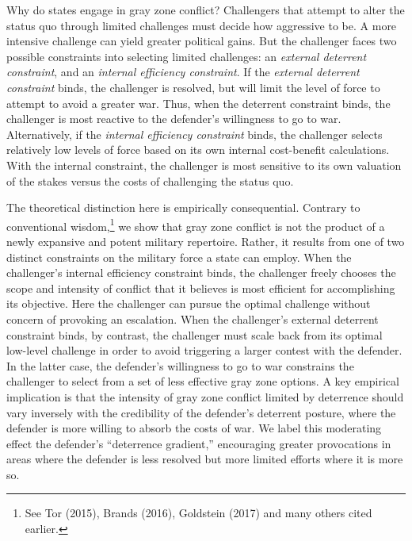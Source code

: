 \documentclass[
]{article}
\begin{document}
Why do states engage in gray zone conflict? Challengers that attempt to alter the status quo through limited challenges must decide how aggressive to be. A more intensive challenge can yield greater political gains. But the challenger faces two possible constraints into selecting limited challenges: an \emph{external deterrent constraint}, and an \emph{internal efficiency constraint}. If the \emph{external deterrent constraint} binds, the challenger is resolved, but will limit the level of force to attempt to avoid a greater war. Thus, when the deterrent constraint binds, the challenger is most reactive to the defender's willingness to go to war. Alternatively, if the \emph{internal efficiency constraint} binds, the challenger selects relatively low levels of force based on its own internal cost-benefit calculations. With the internal constraint, the challenger is most sensitive to its own valuation of the stakes versus the costs of challenging the status quo.

The theoretical distinction here is empirically consequential. Contrary to conventional wisdom,\footnote{See Tor (2015), Brands (2016), Goldstein (2017) and many others cited earlier.} we show that gray zone conflict is not the product of a newly expansive and potent military repertoire. Rather, it results from one of two distinct constraints on the military force a state can employ. When the challenger's internal efficiency constraint binds, the challenger freely chooses the scope and intensity of conflict that it believes is most efficient for accomplishing its objective. Here the challenger can pursue the optimal challenge without concern of provoking an escalation. When the challenger's external deterrent constraint binds, by contrast, the challenger must scale back from its optimal low-level challenge in order to avoid triggering a larger contest with the defender. In the latter case, the defender's willingness to go to war constrains the challenger to select from a set of less effective gray zone options. A key empirical implication is that the intensity of gray zone conflict limited by deterrence should vary inversely with the credibility of the defender's deterrent posture, where the defender is more willing to absorb the costs of war. We label this moderating effect the defender's ``deterrence gradient,'' encouraging greater provocations in areas where the defender is less resolved but more limited efforts where it is more so.
\end{document}
